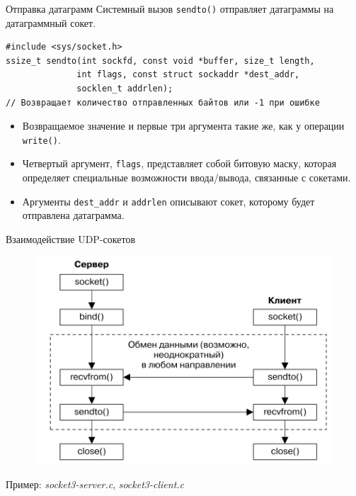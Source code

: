 \documentclass{beamer}
\begin{document}
\begin{frame}[fragile]{Отправка датаграмм}
    Системный вызов \texttt{sendto()} отправляет датаграммы на датаграммный сокет.
    
\begin{verbatim}
#include <sys/socket.h>
ssize_t sendto(int sockfd, const void *buffer, size_t length, 
              int flags, const struct sockaddr *dest_addr, 
              socklen_t addrlen);
// Возвращает количество отправленных байтов или -1 при ошибке
\end{verbatim}

	\begin{itemize}
	    \item Возвращаемое значение и первые три аргумента такие же, как у операции \texttt{write()}.
	    \item Четвертый аргумент, \texttt{flags}, представляет собой битовую маску, которая определяет специальные возможности ввода/вывода, связанные с сокетами.
	    \item Аргументы \texttt{dest\_addr} и \texttt{addrlen} описывают сокет, которому будет отправлена датаграмма.
	\end{itemize}
\end{frame}

\begin{frame}{Взаимодействие UDP-сокетов}
    \begin{figure}
    \includegraphics[scale=0.4]{images/udp_communication.png}
    \end{figure}
    Пример: \textit{socket3-server.c}, \textit{socket3-client.c}
\end{frame}
\end{document}
